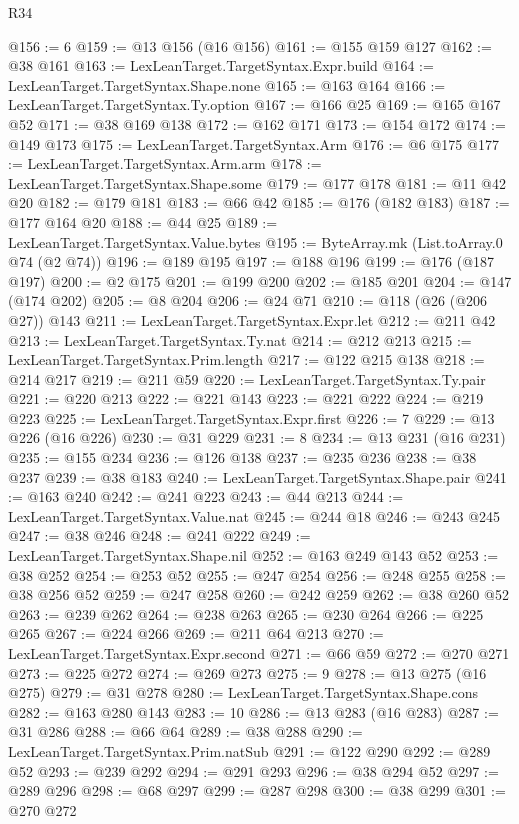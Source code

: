 \begin{lexlean}{R34}
\begin{coremodule}
@156 := 6
@159 := @13 @156 (@16 @156)
@161 := @155 @159 @127
@162 := @38 @161
@163 := LexLeanTarget.TargetSyntax.Expr.build
@164 := LexLeanTarget.TargetSyntax.Shape.none
@165 := @163 @164
@166 := LexLeanTarget.TargetSyntax.Ty.option
@167 := @166 @25
@169 := @165 @167 @52
@171 := @38 @169 @138
@172 := @162 @171
@173 := @154 @172
@174 := @149 @173
@175 := LexLeanTarget.TargetSyntax.Arm
@176 := @6 @175
@177 := LexLeanTarget.TargetSyntax.Arm.arm
@178 := LexLeanTarget.TargetSyntax.Shape.some
@179 := @177 @178
@181 := @11 @42 @20
@182 := @179 @181
@183 := @66 @42
@185 := @176 (@182 @183)
@187 := @177 @164 @20
@188 := @44 @25
@189 := LexLeanTarget.TargetSyntax.Value.bytes
@195 := ByteArray.mk (List.toArray.{0} @74 (@2 @74))
@196 := @189 @195
@197 := @188 @196
@199 := @176 (@187 @197)
@200 := @2 @175
@201 := @199 @200
@202 := @185 @201
@204 := @147 (@174 @202)
@205 := @8 @204
@206 := @24 @71
@210 := @118 (@26 (@206 @27)) @143
@211 := LexLeanTarget.TargetSyntax.Expr.let
@212 := @211 @42
@213 := LexLeanTarget.TargetSyntax.Ty.nat
@214 := @212 @213
@215 := LexLeanTarget.TargetSyntax.Prim.length
@217 := @122 @215 @138
@218 := @214 @217
@219 := @211 @59
@220 := LexLeanTarget.TargetSyntax.Ty.pair
@221 := @220 @213
@222 := @221 @143
@223 := @221 @222
@224 := @219 @223
@225 := LexLeanTarget.TargetSyntax.Expr.first
@226 := 7
@229 := @13 @226 (@16 @226)
@230 := @31 @229
@231 := 8
@234 := @13 @231 (@16 @231)
@235 := @155 @234
@236 := @126 @138
@237 := @235 @236
@238 := @38 @237
@239 := @38 @183
@240 := LexLeanTarget.TargetSyntax.Shape.pair
@241 := @163 @240
@242 := @241 @223
@243 := @44 @213
@244 := LexLeanTarget.TargetSyntax.Value.nat
@245 := @244 @18
@246 := @243 @245
@247 := @38 @246
@248 := @241 @222
@249 := LexLeanTarget.TargetSyntax.Shape.nil
@252 := @163 @249 @143 @52
@253 := @38 @252
@254 := @253 @52
@255 := @247 @254
@256 := @248 @255
@258 := @38 @256 @52
@259 := @247 @258
@260 := @242 @259
@262 := @38 @260 @52
@263 := @239 @262
@264 := @238 @263
@265 := @230 @264
@266 := @225 @265
@267 := @224 @266
@269 := @211 @64 @213
@270 := LexLeanTarget.TargetSyntax.Expr.second
@271 := @66 @59
@272 := @270 @271
@273 := @225 @272
@274 := @269 @273
@275 := 9
@278 := @13 @275 (@16 @275)
@279 := @31 @278
@280 := LexLeanTarget.TargetSyntax.Shape.cons
@282 := @163 @280 @143
@283 := 10
@286 := @13 @283 (@16 @283)
@287 := @31 @286
@288 := @66 @64
@289 := @38 @288
@290 := LexLeanTarget.TargetSyntax.Prim.natSub
@291 := @122 @290
@292 := @289 @52
@293 := @239 @292
@294 := @291 @293
@296 := @38 @294 @52
@297 := @289 @296
@298 := @68 @297
@299 := @287 @298
@300 := @38 @299
@301 := @270 @272

\end{coremodule}
\end{lexlean}
